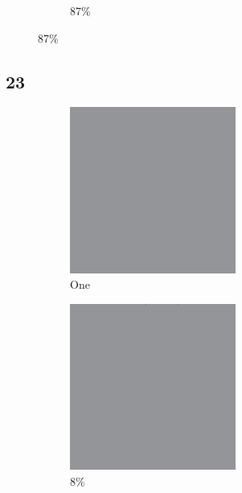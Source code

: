 \documentclass[12pt, fleqn]{report}                             %
\theoremstyle{break}                                            %
\begin{document}
\begin{figure}[ht!]
\begin{subfigure}[b]{0.4\linewidth}
          \caption{87\%}
        \end{subfigure}
      \end{figure}


      \clearpage
      \subsection{23}
      \begin{figure}[ht!]
        \centering
        \begin{subfigure}[b]{0.4\linewidth}
          \includegraphics[width=0.6\textwidth]{Images/23/a.png}
          \caption{One}
        \end{subfigure}
        \begin{subfigure}[b]{0.4\linewidth}
          \includegraphics[width=0.6\textwidth]{Images/23/b.png}
          \caption{8\%}
        \end{subfigure}
        \begin{subfigure}[b]{0.4\linewidth}

\end{subfigure}
\end{figure}
\end{document}
